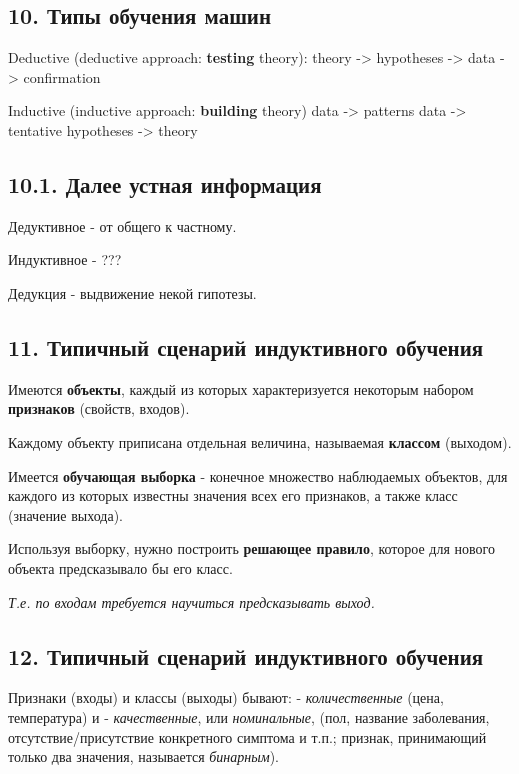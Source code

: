 \subsection{10. Типы обучения машин}

Deductive (deductive approach: \textbf{testing} theory): theory -> hypotheses
-> data -> confirmation

Inductive (inductive approach: \textbf{building} theory) data -> patterns
data -> tentative hypotheses -> theory

\subsection{10.1. Далее устная информация}

Дедуктивное - от общего к частному.

Индуктивное - ???

Дедукция - выдвижение некой гипотезы.

\subsection{11. Типичный сценарий индуктивного обучения}

Имеются \textbf{объекты}, каждый из которых характеризуется некоторым набором
\textbf{признаков} (свойств, входов).

Каждому объекту приписана отдельная величина, называемая \textbf{классом}
(выходом).

Имеется \textbf{обучающая выборка} - конечное множество наблюдаемых объектов,
для каждого из которых известны значения всех его признаков, а также класс
(значение выхода).

Используя выборку, нужно построить \textbf{решающее правило}, которое для нового
объекта предсказывало бы его класс.

\textit{Т.е. по входам требуется научиться предсказывать выход.}

\subsection{12. Типичный сценарий индуктивного обучения}

Признаки (входы) и классы (выходы) бывают:
- \textit{количественные} (цена, температура) и
- \textit{качественные}, или \textit{номинальные}, (пол, название заболевания,
отсутствие/присутствие конкретного симптома и т.п.; признак, принимающий
только два значения, называется \textit{бинарным}).

